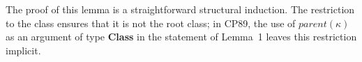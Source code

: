 \begin{AgdaAlign}
The proof of this lemma is a straightforward structural induction.
The restriction to the class  ensures that it is not the root class;
in CP89, the use of $\textit{parent}(κ)$ as an argument of type \textbf{Class}
in the statement of Lemma~1 leaves this restriction implicit.
%
\begin{code}%
\>[0][@{}l@{\AgdaIndent{1}}]%
\>[4]\AgdaSpace{}%
\AgdaSymbol{:}\AgdaSpace{}%
\AgdaSpace{}%
\AgdaSpace{}%
\AgdaSpace{}%
\AgdaSpace{}%
\AgdaSpace{}%
\AgdaSpace{}%
\AgdaSpace{}%
\AgdaSpace{}%
\AgdaSymbol{(}\AgdaSpace{}%
\AgdaSymbol{)}\AgdaSpace{}%
\AgdaSpace{}%
\AgdaSpace{}%
\AgdaSpace{}%
\AgdaSpace{}%
\AgdaSymbol{(}\AgdaSpace{}%
\AgdaSpace{}%
\AgdaSymbol{)}\AgdaSpace{}%
\AgdaSpace{}%
\AgdaSpace{}%
\AgdaSpace{}%
\AgdaSpace{}%
\AgdaSymbol{(}\AgdaSpace{}%
\AgdaSpace{}%
\AgdaSymbol{)}\AgdaSpace{}%
\AgdaSymbol{(}\AgdaSpace{}%
\AgdaSymbol{(}\AgdaSpace{}%
\AgdaSymbol{)}\AgdaSpace{}%
\AgdaSpace{}%
\AgdaSymbol{)}\<%
\\
%
\\[\AgdaEmptyExtraSkip]%
%
\>[4]\AgdaSpace{}%
\AgdaSpace{}%
\AgdaSpace{}%
\AgdaSpace{}%
\AgdaSpace{}%
\AgdaSpace{}%
\AgdaSymbol{=}\<%
\\
\>[4][@{}l@{\AgdaIndent{0}}]%
\>[6]%
\>[13]\AgdaSpace{}%
\AgdaSymbol{(}\AgdaSpace{}%
\AgdaSymbol{)}\AgdaSpace{}%
\AgdaSpace{}%
\AgdaSpace{}%
\AgdaSpace{}%
\AgdaSpace{}%
\AgdaSymbol{(}\AgdaSpace{}%
\AgdaSpace{}%
\AgdaSymbol{)}\<%
\\
%
\>[6]%
\>[13]\AgdaSymbol{(}\AgdaSpace{}%
\AgdaSpace{}%
\AgdaSpace{}%
\AgdaSpace{}%

\end{code}
\end{AgdaAlign}
